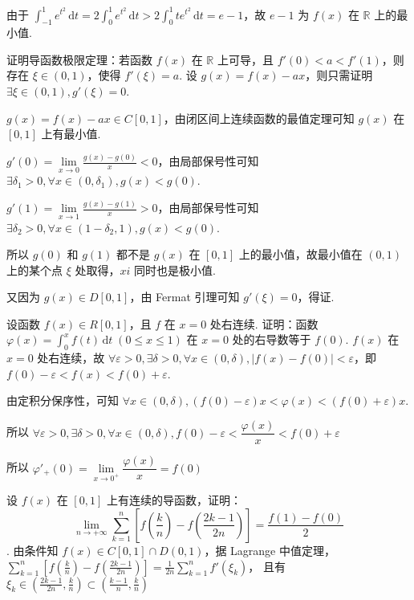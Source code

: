 \documentclass{jhwhw}
\begin{document}
        由于 $\displaystyle\int_{-1}^1 e^{t^2} \,\text{d}t = 2\displaystyle\int_0^1 e^{t^2} \,\text{d}t > 2\displaystyle\int_0^1 te^{t^2} \,\text{d}t = e-1$，故 $e-1$ 为 $f(x)$ 在 $\mathbb{R}$ 上的最小值.


        证明导函数极限定理：若函数 $f(x)$ 在 $\mathbb{R}$ 上可导，且 $f'(0)<a<f'(1)$，则存在 $\xi \in (0,1)$，使得 $f'(\xi)=a$.
    \solution
        设 $g(x)=f(x)-ax$，则只需证明 $\exists \xi \in (0,1), g'(\xi)=0$.

        $g(x)=f(x)-ax \in C[0,1]$，由闭区间上连续函数的最值定理可知 $g(x)$ 在 $[0,1]$ 上有最小值.

        $g'(0)=\lim\limits_{x\to 0} \frac{g(x)-g(0)}{x}<0$，由局部保号性可知 $\exists \delta_1>0, \forall x \in (0,\delta_1), g(x)<g(0)$.

        $g'(1)=\lim\limits_{x\to 1} \frac{g(x)-g(1)}{x}>0$，由局部保号性可知 $\exists \delta_2>0, \forall x \in (1-\delta_2,1), g(x)<g(0)$.

        所以 $g(0)$ 和 $g(1)$ 都不是 $g(x)$ 在 $[0,1]$ 上的最小值，故最小值在 $(0,1)$ 上的某个点 $\xi$ 处取得，$xi$ 同时也是极小值.

        又因为 $g(x)\in D[0,1]$，由 Fermat 引理可知 $g'(\xi)=0$，得证.
    
    
        设函数 $f(x)\in R[0,1]$，且 $f$ 在 $x=0$ 处右连续. 证明：函数 $\varphi(x)=\displaystyle\int_0^x f(t) \,\text{d}t \;(0 \leq x \leq 1)$ 在 $x=0$ 处的右导数等于 $f(0)$.
    \solution
        $f(x)$ 在 $x=0$ 处右连续，故 $\forall \varepsilon>0, \exists \delta>0, \forall x \in (0,\delta), |f(x)-f(0)|<\varepsilon$，即 $f(0)-\varepsilon<f(x)<f(0)+\varepsilon$.

        由定积分保序性，可知 $\forall x \in (0,\delta), (f(0)-\varepsilon)x<\varphi(x)<(f(0)+\varepsilon)x$.

        所以 $\forall \varepsilon>0, \exists \delta>0, \forall x \in (0,\delta),  f(0)-\varepsilon<\dfrac{\varphi(x)}{x}<f(0)+\varepsilon$

        所以 $\varphi'_+(0) = \lim\limits_{x\to 0^+} \dfrac{\varphi(x)}{x} = f(0)$
    

        设 $f(x)$ 在 $[0,1]$ 上有连续的导函数，证明：
        \[
            \lim_{n \to +\infty} \sum_{k=1}^n \left[ f\left(\frac{k}{n}\right) - f\left(\frac{2k-1}{2n}\right) \right] = \frac{f(1)-f(0)}{2}
        \].
    \solution
        由条件知 $f(x) \in C[0,1] \cap D(0,1)$，据 Lagrange 中值定理，$\sum\limits_{k=1}^n \left[ f\left(\frac{k}{n}\right) - f\left(\frac{2k-1}{2n}\right) \right] = \frac{1}{2n} \sum\limits_{k=1}^n f'(\xi_k) $，
        且有 $\xi_k \in \left( \frac{2k-1}{2n},\frac{k}{n} \right) \subset \left( \frac{k-1}{n}, \frac{k}{n} \right)$
\end{document}
